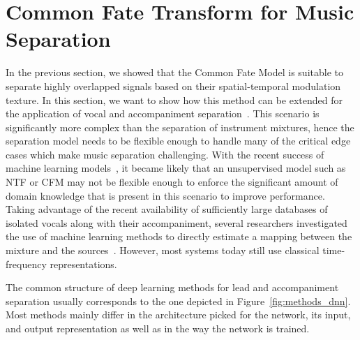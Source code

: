 \section{Common Fate Transform for Music Separation}%
\label{sec:cft_for_lead_accompaniment_separation}


In the previous section, we showed that the Common Fate Model is suitable to separate highly overlapped signals based on their spatial-temporal modulation texture.
In this section, we want to show how this method can be extended for the application of vocal and accompaniment separation~\cite{rafii}.
This scenario is significantly more complex than the separation of instrument mixtures, hence the separation model needs to be flexible enough to handle many of the critical edge cases which make music separation challenging.
With the recent success of machine learning models~\cite{HintonSpeech}, it became likely that an unsupervised model such as NTF or CFM may not be flexible enough to enforce the significant amount of domain knowledge that is present in this scenario to improve performance.
Taking advantage of the recent availability of sufficiently large databases of isolated vocals along with their accompaniment, several researchers investigated the use of machine learning methods to directly estimate a mapping between the mixture and the sources~\cite{huang14, uhlich15}.
However, most systems today still use classical time-frequency representations.
\par
The common structure of deep learning methods for lead and accompaniment separation usually corresponds to the one depicted in Figure~\ref{fig:methods_dnn}.
Most methods mainly differ in the architecture picked for the network, its input, and output representation as well as in the way the network is trained.

